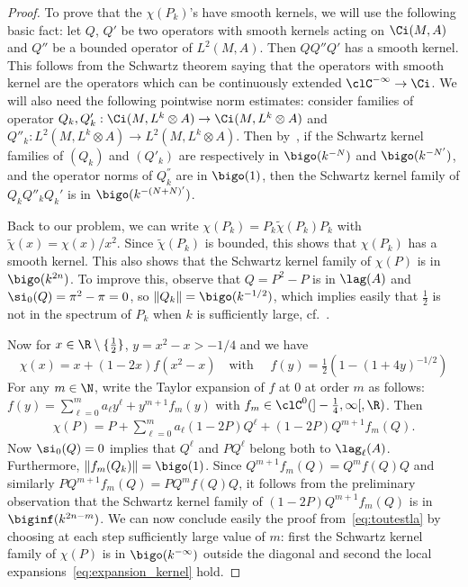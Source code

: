 \begin{proof}
To prove that the $\chi (P_k)$'s have smooth kernels, we will use the following basic fact: let $Q$, $Q'$ be two operators with smooth kernels acting on $\Ci (M,A)$ and $Q''$ be a bounded operator of $L^2(M, A)$. Then $Q Q''Q'$ has a smooth kernel. This follows from the Schwartz theorem saying that the operators with smooth kernel are the operators which can be continuously extended $\clC^{-\infty} \rightarrow \Ci $. We will also need the following pointwise norm estimates: consider families of operator $Q_k, Q'_k : \Ci (M,L^k \otimes A) \rightarrow \Ci (M, L^k\otimes A)$ and $Q''_k : L^2 (M, L^k
\otimes A) \rightarrow L^2 (M, L^k \otimes A)$. Then by~\cite[Section~4.3]{oim}, if the Schwartz kernel families of $(Q_k)$ and $(Q'_k)$ are respectively in $\bigo (k^{-N})$ and $\bigo (k^{-N'})$, and the operator norms of $Q_k^{''}$ are in $\bigo (1)$, then the Schwartz kernel family of $Q_k Q''_k Q_k'$ is in $\bigo (k^{-(N +N)'})$.

Back to our problem, we can write $\chi(P_k) = P_k \tilde{\chi} (P_k) P_k$ with $\tilde{\chi} (x) = \chi(x) / x^2$. Since $ \tilde{\chi}(P_k)$ is bounded, this shows that $\chi (P_k)$ has a smooth kernel. This also shows that the Schwartz kernel family of $\chi (P)$ is in $\bigo (k^{2n})$. To improve this, observe that $Q = P^2 - P$ is in $\lag (A)$ and $\si _0 (Q) = \pi^2 - \pi =0$, so $\| Q_k \| = \bigo (k^{-1/2})$, which implies easily that $\frac{1}{2}$ is not in the spectrum of $P_k$ when $k$ is sufficiently large, cf.~\cite[Proposition~4.2]{oim}.

Now for $x \in \R \setminus \{ \frac{1}{2}\}$, $y = x^2 -x > -1/4 $ and we have
\[
\chi (x) = x + (1-2x) f \left(x^2 -x\right) \quad \text{with } \quad f (y) = \tfrac{1}{2}
\left(1- (1+ 4y)^{-1/2}\right)
\]
 For any $m \in \N$, write the Taylor expansion of $f$ at $0$ at order $m $ as follows:  $f (y) = \sum_{\ell =0}^m a_\ell y^\ell + y^{m+1} f_m (y)$ with $f_m \in \clC^0(]-\frac{1}{4},
\infty[, \R)$. Then
\begin{gather}\label{eq:toutestla}
\chi (P) = P + \sum_{\ell = 0 }^m a_\ell (1-2P) Q^\ell + (1 - 2 P) Q^{m+1} f_m (Q).
\end{gather}
Now $\si_0(Q)=0$ implies that $Q^\ell$ and $PQ^{\ell}$ belong both to $\lag_{\ell} (A)$. Furthermore, $\|f_m(Q_k) \| = \bigo (1)$. Since $Q^{m+1} f_m (Q) = Q^m f(Q) Q$ and similarly $PQ^{m+1} f_m (Q) = PQ^m f(Q) Q$, it follows from the preliminary observation that the Schwartz kernel family of $(1 - 2 P) Q^{m+1} f_m (Q)$ is in $\biginf (k^{2n -m})$. We can now conclude easily the proof from~\eqref{eq:toutestla} by choosing at each step sufficiently large value of $m$: first the Schwartz kernel family of $\chi (P)$ is in $\bigo (k^{-\infty})$ outside the diagonal and second the local expansions~\eqref{eq:expansion_kernel} hold.
\end{proof}


